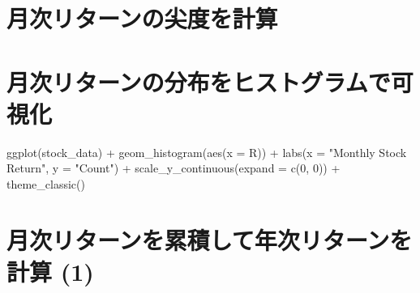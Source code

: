 \documentclass[
  letterpaper,
  DIV=11,
  numbers=noendperiod]{scrreprt}
\newenvironment{Shaded}{\begin{snugshade}}{\end{snugshade}}
\newcommand{\AttributeTok}[1]{\textcolor[rgb]{0.40,0.45,0.13}{#1}}
\newcommand{\CommentTok}[1]{\textcolor[rgb]{0.37,0.37,0.37}{#1}}
\newcommand{\ControlFlowTok}[1]{\textcolor[rgb]{0.00,0.23,0.31}{\textbf{#1}}}
\newcommand{\DecValTok}[1]{\textcolor[rgb]{0.68,0.00,0.00}{#1}}
\newcommand{\FunctionTok}[1]{\textcolor[rgb]{0.28,0.35,0.67}{#1}}
\newcommand{\NormalTok}[1]{\textcolor[rgb]{0.00,0.23,0.31}{#1}}
\newcommand{\OtherTok}[1]{\textcolor[rgb]{0.00,0.23,0.31}{#1}}
\newcommand{\SpecialCharTok}[1]{\textcolor[rgb]{0.37,0.37,0.37}{#1}}
\newcommand{\StringTok}[1]{\textcolor[rgb]{0.13,0.47,0.30}{#1}}
\begin{document}
\section{月次リターンの尖度を計算}\label{ux6708ux6b21ux30eaux30bfux30fcux30f3ux306eux5c16ux5ea6ux3092ux8a08ux7b97}

\begin{Shaded}
\end{Shaded}

\section{月次リターンの分布をヒストグラムで可視化}\label{ux6708ux6b21ux30eaux30bfux30fcux30f3ux306eux5206ux5e03ux3092ux30d2ux30b9ux30c8ux30b0ux30e9ux30e0ux3067ux53efux8996ux5316}

\begin{Shaded}
\begin{Highlighting}[]
\FunctionTok{ggplot}\NormalTok{(stock\_data) }\SpecialCharTok{+} 
  \FunctionTok{geom\_histogram}\NormalTok{(}\FunctionTok{aes}\NormalTok{(}\AttributeTok{x =}\NormalTok{ R)) }\SpecialCharTok{+} 
  \FunctionTok{labs}\NormalTok{(}\AttributeTok{x =} \StringTok{"Monthly Stock Return"}\NormalTok{, }\AttributeTok{y =} \StringTok{"Count"}\NormalTok{) }\SpecialCharTok{+} 
  \FunctionTok{scale\_y\_continuous}\NormalTok{(}\AttributeTok{expand =} \FunctionTok{c}\NormalTok{(}\DecValTok{0}\NormalTok{, }\DecValTok{0}\NormalTok{)) }\SpecialCharTok{+}
  \FunctionTok{theme\_classic}\NormalTok{()}
\end{Highlighting}
\end{Shaded}

\section{月次リターンを累積して年次リターンを計算
(1)}\label{ux6708ux6b21ux30eaux30bfux30fcux30f3ux3092ux7d2fux7a4dux3057ux3066ux5e74ux6b21ux30eaux30bfux30fcux30f3ux3092ux8a08ux7b97-1}
\end{document}

